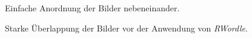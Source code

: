 \documentclass[12pt, ngerman, utf8]{article}
\begin{document}
\begin{figure}[hp]
    \noindent
    \caption{Einfache Anordnung der Bilder nebeneinander.}
    \label{fig:rwordle-flower-simple}
\end{figure}
\begin{figure}[hp]
    \noindent
    \caption{Starke Überlappung der Bilder vor der Anwendung von \textit{RWordle}.}
    \label{fig:rwordle-flower-overlap-strong}
\end{figure}
\end{document}
